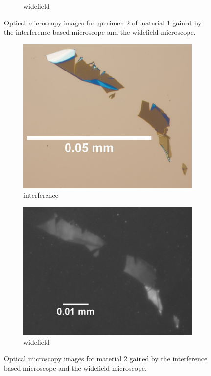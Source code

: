 \begin{figure}[!ht]
\begin{subfigure}{0.47\textwidth}
        \caption{widefield}
	      \label{fig_mono_spec2_wide}
    \end{subfigure}
    \caption{Optical microscopy images for specimen 2 of material 1 gained by the interference based microscope and the widefield microscope.}
	\label{fig_mono_spec2} %
\end{figure}

\begin{figure}[!ht]
    \centering
    \begin{subfigure}{0.47\textwidth}
        \centering
        \includegraphics[width=1.0\textwidth]{img/output_t1/M2_1_100_adj}
        \caption{interference}
	      \label{fig_mono_spec3_int}
    \end{subfigure}
    \hfill
    \begin{subfigure}{0.47\textwidth}
        \centering
        \includegraphics[width=\textwidth]{img/output_t1/M2_1_50_adj_photo4}
        \caption{widefield}
	      \label{fig_mono_spec3_wide}
    \end{subfigure}
    \caption{Optical microscopy images for material 2 gained by the interference based microscope and the widefield microscope.}
	\label{fig_mono_spec3} %
\end{figure}


